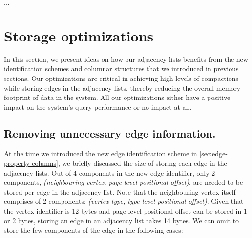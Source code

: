 ...

\section{Storage optimizations}
\label{sec:storage-optimizations}

In this section, we present ideas on how our adjacency lists benefits from the new identification schemes and columnar structures that we introduced in previous sections. Our optimizations are critical in achieving high-levels of compactions while storing edges in the adjacency lists, thereby reducing the overall memory footprint of data in the system. All our optimizations either have a positive impact on the system's query performance or no impact at all.

\subsection{Removing unnecessary edge information.}

At the time we introduced the new edge identification scheme in \ref{sec:edge-property-columns}, we briefly discussed the size of storing each edge in the adjacency lists. Out of 4 components in the new edge identifier, only 2 components, \emph{(neighbouring vertex, page-level positional offset)}, are needed to be stored per edge in the adjacency list. Note that the neighbouring vertex itself comprises of 2 components: \emph{(vertex type, type-level positional offset)}. Given that the vertex identifier is 12 bytes and page-level positional offset can be stored in 1 or 2 bytes, storing an edge in an adjacency list takes 14 bytes. We can omit to store the few components of the edge in the following cases: 

